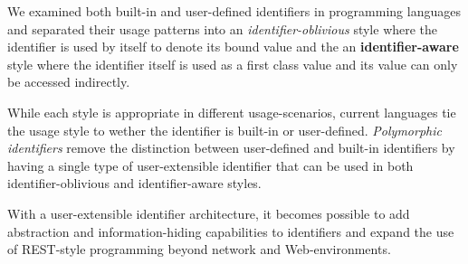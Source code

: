 \documentclass[preprint,authoryear]{acm_proc_article-sp}
\begin{document}
We examined both built-in and user-defined identifiers in programming languages 
and separated their usage patterns into an {\em identifier-oblivious} style where
the identifier is used by itself to denote its bound value and the 
an {\bf identifier-aware} style where the identifier itself is used as a first class value
and its value can only be accessed indirectly.

While each style is appropriate in different usage-scenarios, current languages 
tie the usage style to wether the identifier is built-in or user-defined.  \emph{Polymorphic
identifiers} remove the distinction between user-defined and built-in identifiers by having
a single type of user-extensible identifier that can be used in both identifier-oblivious
and identifier-aware styles.

With a user-extensible identifier architecture, it becomes possible to add abstraction
and information-hiding capabilities to identifiers and expand the use of REST-style
programming beyond network and Web-environments.







\vfill
\break





\balancecolumns
\end{document}
